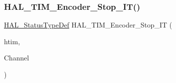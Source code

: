 \subsubsection{\texorpdfstring{H\+A\+L\+\_\+\+T\+I\+M\+\_\+\+Encoder\+\_\+\+Stop\+\_\+\+I\+T()}{HAL\_TIM\_Encoder\_Stop\_IT()}}
{\footnotesize\ttfamily \hyperlink{stm32f4xx__hal__def_8h_a63c0679d1cb8b8c684fbb0632743478f}{H\+A\+L\+\_\+\+Status\+Type\+Def} H\+A\+L\+\_\+\+T\+I\+M\+\_\+\+Encoder\+\_\+\+Stop\+\_\+\+IT (\begin{DoxyParamCaption}\item[{\hyperlink{struct_t_i_m___handle_type_def}{T\+I\+M\+\_\+\+Handle\+Type\+Def} $\ast$}]{htim,  }\item[{uint32\+\_\+t}]{Channel }\end{DoxyParamCaption})}

